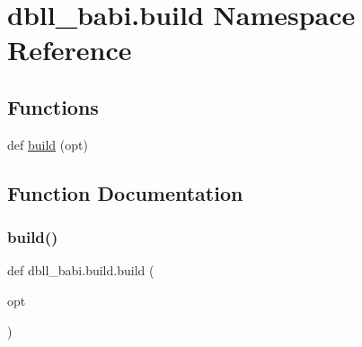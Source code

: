 \hypertarget{namespacedbll__babi_1_1build}{}\section{dbll\+\_\+babi.\+build Namespace Reference}
\label{namespacedbll__babi_1_1build}
\subsection*{Functions}
\begin{DoxyCompactItemize}
\item 
def \hyperlink{namespacedbll__babi_1_1build_a841db6f39b42d47e268ec9a6d4e05458}{build} (opt)
\end{DoxyCompactItemize}


\subsection{Function Documentation}
\mbox{\label{namespacedbll__babi_1_1build_a841db6f39b42d47e268ec9a6d4e05458}} 
\subsubsection{\texorpdfstring{build()}{build()}}
{\footnotesize\ttfamily def dbll\+\_\+babi.\+build.\+build (\begin{DoxyParamCaption}\item[{}]{opt }\end{DoxyParamCaption})}

